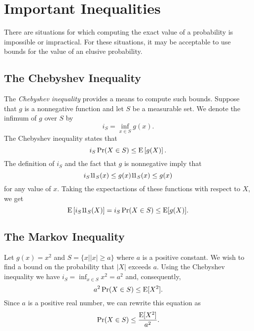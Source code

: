 \section{Important Inequalities}

There are situations for which computing the exact value of a probability is impossible or impractical.
For these situations, it may be acceptable to use bounds for the value of an elusive probability.


\subsection{The Chebyshev Inequality}

The \emph{Chebyshev inequality} provides a means to compute such bounds.
Suppose that $g$ is a nonnegative function and let $S$ be a measurable set.
We denote the infimum of $g$ over $S$ by
\begin{equation*}
i_S = \inf_{ x \in S } g (x) .
\end{equation*}
The Chebyshev inequality states that
\begin{equation*}
i_S \Pr (X \in S)
\leq \mathrm{E} \left[ g(X) \right] .
\end{equation*}
The definition of $i_S$ and the fact that $g$ is nonnegative imply that
\begin{equation*}
i_S \mathrm{1\!1}_S (x) \leq g(x) \mathrm{1\!1}_S (x) \leq g(x)
\end{equation*}
for any value of $x$.
Taking the expectactions of these functions with respect to $X$, we get
\begin{equation*}
\mathrm{E} \left[ i_S \mathrm{1\!1}_S (X) \right]
= i_S \Pr (X \in S) \leq \mathrm{E} [g (X)] .
\end{equation*}


\subsection{The Markov Inequality}

Let $g(x) = x^2$ and $S = \{ x | |x| \geq a \}$ where $a$ is a positive constant.
We wish to find a bound on the probability that $|X|$ exceeds $a$.
Using the Chebyshev inequality we have $i_S = \inf_{x \in S} x^2 = a^2$ and, consequently,
\begin{equation*}
a^2 \Pr (X \in S) \leq \mathrm{E} [X^2] .
\end{equation*}
Since $a$ is a positive real number, we can rewrite this equation as
\begin{equation*}
\Pr (X \in S) \leq \frac{\mathrm{E} [X^2]}{a^2} .
\end{equation*}

